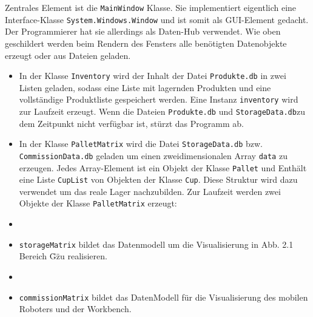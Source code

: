     Zentrales Element ist die \verb|MainWindow| Klasse.
    Sie implementiert eigentlich eine Interface-Klasse \verb|System.Windows.Window| und ist somit als GUI-Element gedacht.
    Der Programmierer hat sie allerdings als Daten-Hub verwendet.
    Wie oben geschildert werden beim Rendern des Fensters alle benötigten Datenobjekte erzeugt oder aus Dateien geladen.
    \begin{itemize}
        \item In der Klasse \verb|Inventory| wird der Inhalt der Datei \verb|Produkte.db| in zwei Listen geladen, sodass
        eine Liste mit lagernden Produkten und eine vollständige Produktliste gespeichert werden.
        Eine Instanz \verb|inventory| wird zur Laufzeit erzeugt. Wenn die Dateien \verb|Produkte.db| und
        \verb|StorageData.db|zu dem Zeitpunkt nicht verfügbar ist, stürzt das Programm ab.
        \item In der Klasse \verb|PalletMatrix| wird die Datei \verb|StorageData.db| bzw. \verb|CommissionData.db|
        geladen um einen zweidimensionalen Array \verb|data| zu erzeugen.
        Jedes Array-Element ist ein Objekt der Klasse \verb|Pallet| und Enthält eine Liste \verb|CupList| von Objekten
        der Klasse \verb|Cup|.
        Diese Struktur wird dazu verwendet um das reale Lager nachzubilden.
        Zur Laufzeit werden zwei Objekte der Klasse \verb|PalletMatrix| erzeugt:
        \item \item \verb|storageMatrix| bildet das Datenmodell um die Visualisierung in Abb. 2.1 Bereich \"G\" zu realisieren.
        \item \item \verb|commissionMatrix| bildet das DatenModell für die Visualisierung des mobilen Roboters und der
        Workbench. 
    \end{itemize}
